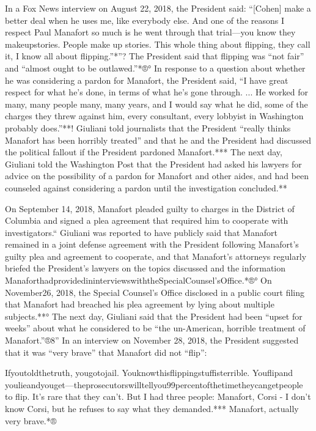 In a Fox News interview on August 22, 2018, the President said: “[Cohen] make a better deal when he uses me, like everybody else.
And one of the reasons I respect Paul Manafort so much is he went through that trial—you know they makeupstories.
People make up stories.
This whole thing about flipping, they call it, I know all about flipping.”*”?
The President said that flipping was “not fair” and “almost ought to be outlawed.”*®°
In response to a question about whether he was considering a pardon for Manafort, the President said, “I have great respect for what he's done, in terms of what he's gone through. ...
He worked for many, many people many, many years, and I would say what he did, some of the charges they threw against him, every consultant, every lobbyist in Washington probably does.”**!
Giuliani told journalists that the President “really thinks Manafort has been horribly treated” and that he and the President had discussed the political fallout if the President pardoned Manafort.***
The next day, Giuliani told the Washington Post that the President had asked his lawyers for advice on the possibility of a pardon for Manafort and other aides, and had been counseled against considering a pardon until the investigation concluded.**

On September 14, 2018, Manafort pleaded guilty to charges in the District of Columbia and signed a plea agreement that required him to cooperate with investigators.“
Giuliani was reported to have publicly said that Manafort remained in a joint defense agreement with the President following Manafort's guilty plea and agreement to cooperate, and that Manafort's attorneys regularly briefed the President's lawyers on the topics discussed and the information ManaforthadprovidedininterviewswiththeSpecialCounsel'sOffice.*®°
On November26, 2018, the Special Counsel's Office disclosed in a public court filing that Manafort had breached his plea agreement by lying about multiple subjects.**°
The next day, Giuliani said that the President had been “upset for weeks” about what he considered to be “the un-American, horrible treatment of Manafort.”®8”
In an interview on November 28, 2018, the President suggested that it was “very brave” that Manafort did not “flip”:

Ifyoutoldthetruth, yougotojail.
Youknowthisflippingstuffisterrible.
Youflipand youlieandyouget—theprosecutorswilltellyou99percentofthetimetheycangetpeople to flip.
It's rare that they can't.
But I had three people: Manafort, Corsi - I don't know Corsi, but he refuses to say what they demanded.***
Manafort, actually very brave.*®

